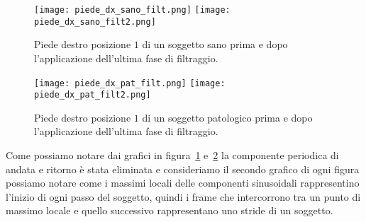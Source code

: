 \begin{figure}[H]
    \centering
    \texttt{[image: piede\_dx\_sano\_filt.png]}
    \texttt{[image: piede\_dx\_sano\_filt2.png]}
    \caption{Piede destro posizione $1$ di un soggetto sano prima e dopo l'applicazione dell'ultima fase di filtraggio.}
    \label{fig:piede_dx_1_sano_filt2}
\end{figure}
\begin{figure}[H]
    \centering
    \texttt{[image: piede\_dx\_pat\_filt.png]}
    \texttt{[image: piede\_dx\_pat\_filt2.png]}
    \caption{Piede destro posizione $1$ di un soggetto patologico prima e dopo l'applicazione dell'ultima fase di filtraggio.}
    \label{fig:piede_dx_1_pat_filt2}
\end{figure}

Come possiamo notare dai grafici in figura~\ref{fig:piede_dx_1_sano_filt2} 
e~\ref{fig:piede_dx_1_pat_filt2} la componente periodica di andata e ritorno 
è stata eliminata 
e consideriamo il secondo grafico di ogni figura possiamo notare come i massimi locali 
delle componenti sinusoidali rappresentino l'inizio di ogni passo del soggetto,
quindi i frame che intercorrono tra un punto di massimo locale e quello successivo rappresentano
uno stride di un soggetto.